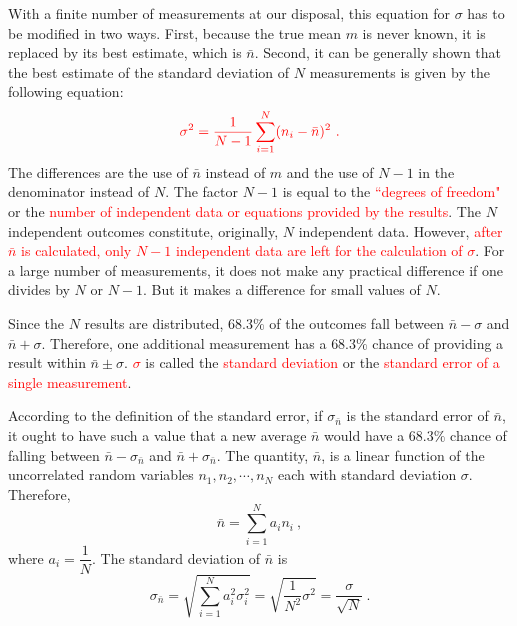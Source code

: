 \documentclass[12pt,a4paper]{article}
\begin{document}
With a finite number of measurements at our disposal, this equation for $\sigma$ has to be modified in two ways. First, because the true mean $m$ is never known, it is replaced by its best estimate, which is $\bar{n}$. Second, it can be generally shown that the best estimate of the standard deviation of $N$ measurements is given by the following equation:
\begin{equation}
\color{red} \sigma^2 =\dfrac{1}{N-1}  \sum_{i=1}^N (n_i- \bar{n})^2 ~.
\end{equation}
The differences are the use of $\bar{n}$ instead of $m$ and the use of $N-1$ in the denominator instead of $N$. The factor $N - 1$ is equal to the \textcolor{red}{``degrees of freedom"} or the \textcolor{red}{number of independent data or equations provided by the results}. The $N$ independent outcomes constitute, originally, $N$ independent data. However, \textcolor{red}{after $\bar{n}$ is calculated, only $N - 1$ independent data are left for the calculation of $\sigma$}. For a large number of measurements, it does not make any practical difference if one divides by $N$ or $N - 1$. But it makes a difference for small values of $N$.

Since the $N$ results are distributed, $68.3\%$ of the outcomes fall between $\bar{n}- \sigma$ and $\bar{n}+ \sigma$. Therefore, one additional measurement has a $68.3\%$ chance of providing a result within $\bar{n}\pm \sigma$. \textcolor{red}{$\sigma$} is called the \textcolor{red}{standard deviation} or the \textcolor{red}{standard error of a single measurement}.

 
 According to the definition of the standard error, if $\sigma_{\bar{n}}$ is the standard error of $\bar{n}$, it ought to have such a value that a new average $\bar{n}$ would have a $68.3\%$ chance of falling between $\bar{n}- \sigma_{\bar{n}}$ and $\bar{n}+ \sigma_{\bar{n}}$. The quantity, $\bar{n}$, is a linear function of the uncorrelated random variables $n_1, n_2, \cdots, n_N$ each with standard deviation $\sigma$. Therefore, 
\begin{equation}
\bar{n} = \sum_{i=1}^N a_i n_i ~,
\end{equation}
 where $a_i = \dfrac{1}{N}$. The standard deviation of $\bar{n}$ is
\begin{equation}
\sigma_{\bar{n}} = \sqrt{\sum_{i=1}^N a_i^2 \sigma_i^2} = \sqrt{\dfrac{1}{N^2} \sigma^2} = \dfrac{\sigma}{\sqrt{N}} ~.
\end{equation}
 
\end{document}
